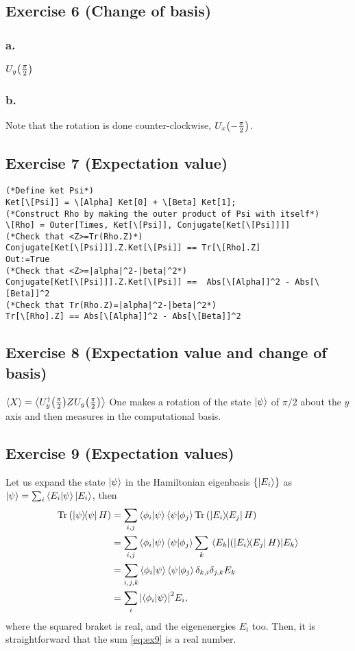 \subsection{Exercise 6 (Change of basis)}\noindent
\subsubsection{a.}
$U_y\qty(\frac{\pi}{2})$

\subsubsection{b.}
Note that the rotation is done counter-clockwise, $U_x\qty(-\frac{\pi}{2})$.

\subsection{Exercise 7 (Expectation value)}
\begin{verbatim}
(*Define ket Psi*)
Ket[\[Psi]] = \[Alpha] Ket[0] + \[Beta] Ket[1];
(*Construct Rho by making the outer product of Psi with itself*)
\[Rho] = Outer[Times, Ket[\[Psi]], Conjugate[Ket[\[Psi]]]]
(*Check that <Z>=Tr(Rho.Z)*)
Conjugate[Ket[\[Psi]]].Z.Ket[\[Psi]] == Tr[\[Rho].Z]
Out:=True
(*Check that <Z>=|alpha|^2-|beta|^2*)
Conjugate[Ket[\[Psi]]].Z.Ket[\[Psi]] ==  Abs[\[Alpha]]^2 - Abs[\[Beta]]^2
(*Check that Tr(Rho.Z)=|alpha|^2-|beta|^2*)
Tr[\[Rho].Z] == Abs[\[Alpha]]^2 - Abs[\[Beta]]^2
\end{verbatim}

\subsection{Exercise 8 (Expectation value and change of basis)}\noindent
$\expval{X}=\expval{U_y^{\dagger}\qty(\frac{\pi}{2})ZU_y\qty(\frac{\pi}{2})}$
One makes a rotation of the state $\ket{\psi}$ of $\pi/2$ about the $y$ axis and 
then measures in the computational basis.

\subsection{Exercise 9 (Expectation values)}\noindent
Let us expand the state $\ket{\psi}$ in the Hamiltonian eigenbasis $\qty{\ket{E_i}}$
as $\ket{\psi}=\sum_i\braket{E_i}{\psi}\ket{E_i}$, then
\begin{subequations}
\begin{align}
\Tr \qty(\dyad{\psi}{\psi}H)
&=\sum_{i,j}\braket{\phi_i}{\psi}\braket{\psi}{\phi_j}\Tr \qty(\dyad{E_i}{E_j}H)\\
&=\sum_{i,j}\braket{\phi_i}{\psi}\braket{\psi}{\phi_j}\sum_k 
\matrixel{E_k}{\qty(\dyad{E_i}{E_j}H)}{E_k}\\
&=\sum_{i,j,k}\braket{\phi_i}{\psi}\braket{\psi}{\phi_j} \delta_{k,i}\delta_{j.k}E_k\\
&=\sum_i\abs{\braket{\phi_i}{\psi}}^2 E_i,\label{eq:ex9}
\end{align}
\end{subequations}
where the squared braket is real, and the eigenenergies $E_i$ too. Then, it is straightforward 
that the sum \eqref{eq:ex9} is a real number.

